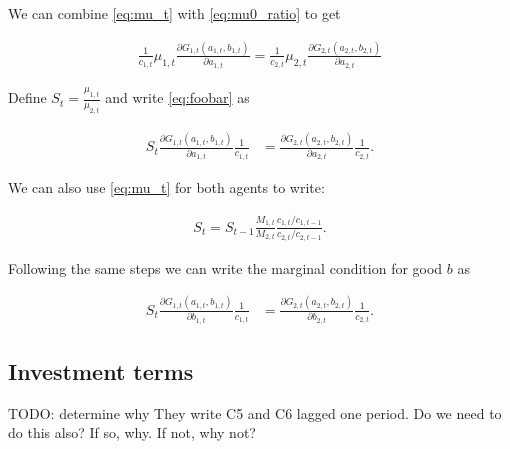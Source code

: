 \documentclass[10pt]{article}
\newcommand{\fracpd}[2]{
  \ensuremath{\frac{\partial #1}{\partial #2}}
}
\begin{document}
We can combine \eqref{eq:mu_t} with \eqref{eq:mu0_ratio} to get

\begin{align} \label{eq:foobar}
  \frac{1}{c_{1,t}} \mu_{1,t} \fracpd{G_{1,t}(a_{1,t}, b_{1,t})}{a_{1,t}} = \frac{1}{c_{2,t}} \mu_{2,t} \fracpd{G_{2,t}(a_{2,t}, b_{2,t})}{a_{2,t}}
\end{align}

Define $S_t = \frac{\mu_{1,t}}{\mu_{2,t}}$ and write \eqref{eq:foobar} as

\begin{align} \label{eq:a_allocation}
  S_t \fracpd{G_{1,t}(a_{1,t}, b_{1,t})}{a_{1,t}} \frac{1}{c_{1,t}} &= \fracpd{G_{2,t}(a_{2,t}, b_{2,t})}{a_{2,t}} \frac{1}{c_{2,t}}.
\end{align}

We can also use \eqref{eq:mu_t} for both agents to write:

\begin{align} \label{eq:S_recursion}
  S_t = S_{t-1} \frac{M_{1,t}}{M_{2,t}} \frac{c_{1,t}/c_{1,t-1}}{c_{2,t}/c_{2,t-1}}.
\end{align}

Following the same steps we can write the marginal condition for good $b$ as

\begin{align} \label{eq:b_allocation}
  S_t \fracpd{G_{1,t}(a_{1,t}, b_{1,t})}{b_{1,t}} \frac{1}{c_{1,t}} &= \fracpd{G_{2,t}(a_{2,t}, b_{2,t})}{b_{2,t}} \frac{1}{c_{2,t}}.
\end{align}

\subsection{Investment terms} \label{sub:Investment terms}

TODO: determine why They write C5 and C6 lagged one period. Do we need to do this also? If so, why. If not, why not?
\end{document}
